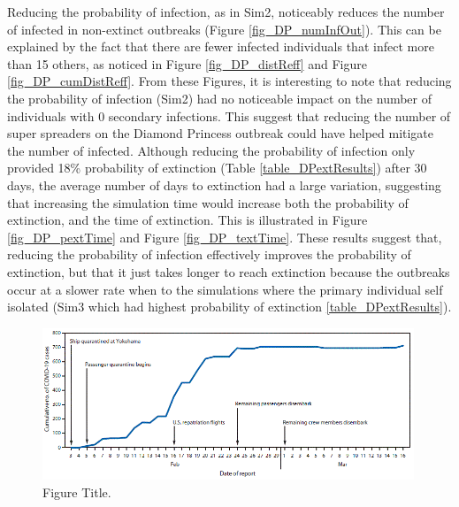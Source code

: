 \documentclass[sr]{drdc-report}
\begin{document}
Reducing the probability of infection, as in Sim2, noticeably reduces the number of infected in non-extinct outbreaks (Figure \ref{fig_DP_numInfOut}). This can be explained by the fact that there are fewer infected individuals that infect more than 15 others, as noticed in Figure \ref{fig_DP_distReff} and Figure \ref{fig_DP_cumDistReff}. From these Figures, it is interesting to note that reducing the probability of infection (Sim2) had no noticeable impact on the number of individuals with 0 secondary infections. This suggest that reducing the number of super spreaders on the Diamond Princess outbreak could have helped mitigate the number of infected. Although reducing the probability of infection only provided 18\% probability of extinction (Table \ref{table_DPextResults}) after 30 days, the average number of days to extinction had a large variation, suggesting that increasing the simulation time would increase both the probability of extinction, and the time of extinction. This is illustrated in Figure \ref{fig_DP_pextTime} and Figure \ref{fig_DP_textTime}. These results suggest that, reducing the probability of infection effectively improves the probability of extinction, but that it just takes longer to reach extinction because the outbreaks occur at a slower rate when to the simulations where the primary individual self isolated (Sim3 which had highest probability of extinction  \ref{table_DPextResults}). 


\begin{figure}
  \includegraphics[width=0.99\textwidth, keepaspectratio=true]{figures/chrono_DP}
  \caption{Figure Title.}\label{fig_chrono_DP}
\end{figure}
\end{document}
